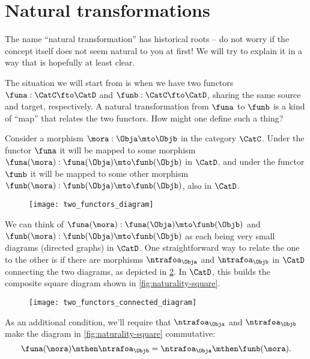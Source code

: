
\section{Natural transformations}


The name ``natural transformation'' has historical roots -- do not worry if the concept itself does not seem natural to you at first! We will try to explain it in a way that is hopefully at least clear. 

The situation we will start from is when we have two functors $\funa : \CatC \fto \CatD$  and $\funb : \CatC \fto \CatD$, sharing the same source and target, respectively. A natural transformation from $\funa$ to $\funb$ is a kind of ``map'' that relates the two functors. How might one define such a thing? 

Consider a morphism $\mora : \Obja \mto \Objb$ in the category $\CatC$. Under the functor $\funa$ it will be mapped to some morphism $\funa(\mora): \funa(\Obja) \mto \funb(\Objb)$ in $\CatD$, and under the functor $\funb$ it will be mapped to some other morphism $\funb(\mora): \funb(\Obja) \mto \funb(\Objb)$, also in $\CatD$. 

%
\begin{figure}[h!]
    \texttt{[image: two\_functors\_diagram]}
    \caption{}
    \label{fig:two-functors-diagram}
\end{figure}
%



We can think of $\funa(\mora): \funa(\Obja) \mto \funb(\Objb)$ and $\funb(\mora): \funb(\Obja) \mto \funb(\Objb)$ as each being very small diagrams (directed graphs) in $\CatD$. One straightforward way to relate the one to the other is if there are morphisms $\ntrafoa_\Obja$ and $\ntrafoa_\Objb$ in $\CatD$ connecting the two diagrams, as depicted in \cref{fig:two-functors-connected-diagram}. In $\CatD$, this builds the composite square diagram shown in \cref{fig:naturality-square}. 

%
\begin{figure}[h!]
    \texttt{[image: two\_functors\_connected\_diagram]}
    \caption{}
    \label{fig:two-functors-connected-diagram}
\end{figure}
%


As an additional condition, we'll require that  $\ntrafoa_\Obja$ and $\ntrafoa_\Objb$ make the diagram in \cref{fig:naturality-square} commutative:
\begin{equation}
\funa(\mora) \mthen \ntrafoa_\Objb = \ntrafoa_\Obja \mthen \funb(\mora).
\end{equation}


